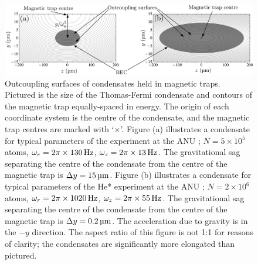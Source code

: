 \begin{figure}
    \centering
    \includegraphics[width=15cm]{OutcouplingSurfaces}
    \caption{Outcoupling surfaces of condensates held in magnetic traps.  Pictured is the size of the Thomas-Fermi condensate and contours of the magnetic trap equally-spaced in energy.  The origin of each coordinate system is the centre of the condensate, and the magnetic trap centres are marked with `$\times$'.  Figure (a) illustrates a condensate for typical parameters of the  experiment at the ANU \citep{Jeppesen:2008}; $N = 5 \times 10^5$ atoms, $\omega_r = 2 \pi \times \unit[130]{Hz}$, $\omega_z = 2 \pi \times \unit[13]{Hz}$.  The gravitational sag separating the centre of the condensate from the centre of the magnetic trap is $\Delta y = \unit[15]{\micro m}$.  Figure (b) illustrates a condensate for typical parameters of the He* experiment at the ANU \citep{Dall:2007a,Dall:2007}; $N = 2 \times 10^6$ atoms, $\omega_r = 2\pi \times \unit[1020]{Hz}$, $\omega_z = 2 \pi \times \unit[55]{Hz}$.  The gravitational sag separating the centre of the condensate from the centre of the magnetic trap is $\Delta y = \unit[0.2]{\micro m}$.  The acceleration due to gravity is in the $-y$ direction.  The aspect ratio of this figure is not 1:1 for reasons of clarity; the condensates are significantly more elongated than pictured.}
    \label{BackgroundTheory:OutcouplingSurfaces}
\end{figure}


